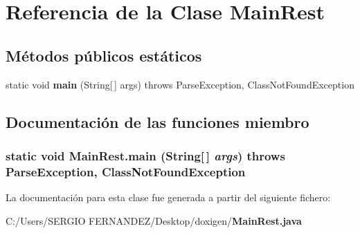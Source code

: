 \section{Referencia de la Clase MainRest}
\label{class_main_rest}
\subsection*{Métodos públicos estáticos}
\begin{CompactItemize}
\item 
static void {\bf main} (String[$\,$] args)  throws ParseException, ClassNotFoundException 
\end{CompactItemize}


\subsection{Documentación de las funciones miembro}
\subsubsection[{main}]{\setlength{\rightskip}{0pt plus 5cm}static void MainRest.main (String[$\,$] {\em args})  throws ParseException, ClassNotFoundException \hspace{0.3cm}{\tt  [static]}}\label{class_main_rest_7de83c06649d9357ef640a20ddad2ca2}




La documentación para esta clase fue generada a partir del siguiente fichero:\begin{CompactItemize}
\item 
C:/Users/SERGIO FERNANDEZ/Desktop/doxigen/{\bf MainRest.java}\end{CompactItemize}

